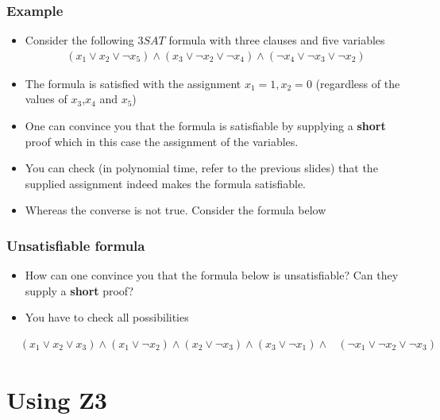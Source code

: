 \documentclass{beamer}
\begin{document}
\begin{frame}
  \frametitle{Example}
  \begin{itemize}
  \item Consider the following $3SAT$ formula with three clauses and five variables
    \begin{align*}
      \left(x_1\lor x_2\lor\lnot x_5  \right) \land \left(x_3\lor\lnot x_2\lor\lnot x_4  \right)\land \left(\lnot x_4\lor\lnot x_3\lor\lnot x_2  \right)
    \end{align*}
\item The formula is satisfied with the assignment $x_1=1,x_2=0$ (regardless of the values of $x_3$,$x_4$ and $x_5$)
\item One can convince you that the formula is satisfiable by supplying a \textbf{short} proof which in this case the assignment of the variables.
 \item You can check (in polynomial time, refer to the previous slides) that the supplied assignment indeed makes the formula satisfiable.
\item Whereas the converse is not true. Consider the formula below 
  \end{itemize}
\end{frame}

\begin{frame}
 \frametitle{Unsatisfiable formula}
    \begin{itemize}
    \item  How can one convince you that the formula below is unsatisfiable? Can they supply a \textbf{short} proof?
   \item You have to check all possibilities 
    \end{itemize}

    \begin{align*}
      &\left(x_1\lor x_2\lor x_3  \right) \land \left(x_1\lor\lnot x_2\right)\land \left( x_2\lor\lnot x_3 \right)\land\left(x_3\lor \lnot x_1\right)      \land &\left(\lnot x_1\lor\lnot x_2\lor\lnot x_3 \right) 
    \end{align*}

\end{frame}

\section{Using Z3}
\end{document}
